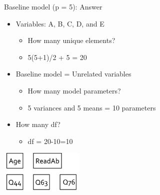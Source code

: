 \documentclass[10pt]{beamer}\usepackage[]{graphicx}\usepackage[]{xcolor}
\begin{document}
\begin{frame}[fragile]{Baseline model (p = 5): Answer}

\begin{itemize}
\item{Variables: A, B, C, D, and E}  
  \begin{itemize}
    \item{How many unique elements?}
    \item{5(5+1)/2 + 5 = 20}
  \end{itemize}
\vspace{5mm}
\item{Baseline model = Unrelated variables}
  \begin{itemize}
    \item{How many model parameters?}
    \item{5 variances and 5 means = 10 parameters}
  \end{itemize}
\vspace{5mm}
\item{How many df?}
  \begin{itemize}
    \item{df = 20-10=10}
  \end{itemize}
\end{itemize}

\vspace{5mm}

\includegraphics[height=2cm,keepaspectratio=T] {baseline5.png}

\end{frame}
%
\end{document}
